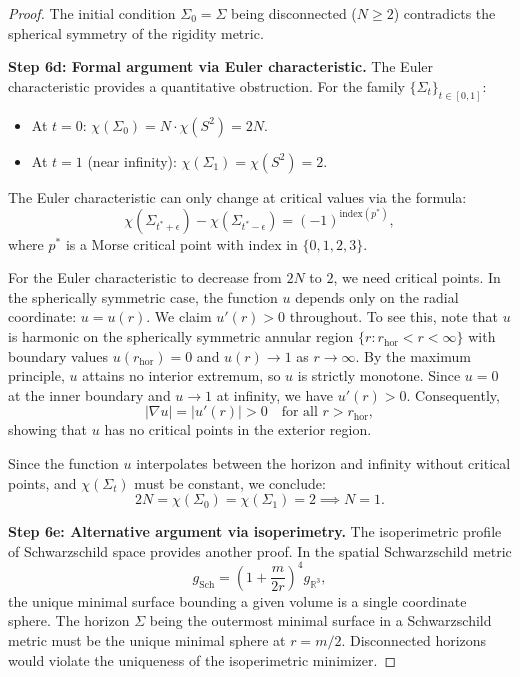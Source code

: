 \begin{proof}
The initial condition $\Sigma_0 = \Sigma$ being disconnected ($N \ge 2$) contradicts the spherical symmetry of the rigidity metric.

\textbf{Step 6d: Formal argument via Euler characteristic.}
The Euler characteristic provides a quantitative obstruction. For the family $\{\Sigma_t\}_{t \in [0,1]}$:
\begin{itemize}
    \item At $t = 0$: $\chi(\Sigma_0) = N \cdot \chi(S^2) = 2N$.
    \item At $t = 1$ (near infinity): $\chi(\Sigma_1) = \chi(S^2) = 2$.
\end{itemize}
The Euler characteristic can only change at critical values via the formula:
\begin{equation}
    \chi(\Sigma_{t^*+\epsilon}) - \chi(\Sigma_{t^*-\epsilon}) = (-1)^{\text{index}(p^*)},
\end{equation}
where $p^*$ is a Morse critical point with index in $\{0, 1, 2, 3\}$.

For the Euler characteristic to decrease from $2N$ to $2$, we need critical points. In the spherically symmetric case, the function $u$ depends only on the radial coordinate: $u = u(r)$. We claim $u'(r) > 0$ throughout. To see this, note that $u$ is harmonic on the spherically symmetric annular region $\{r : r_{\mathrm{hor}} < r < \infty\}$ with boundary values $u(r_{\mathrm{hor}}) = 0$ and $u(r) \to 1$ as $r \to \infty$. By the maximum principle, $u$ attains no interior extremum, so $u$ is strictly monotone. Since $u = 0$ at the inner boundary and $u \to 1$ at infinity, we have $u'(r) > 0$. Consequently,
\begin{equation}
    |\nabla u| = |u'(r)| > 0 \quad \text{for all } r > r_{\mathrm{hor}},
\end{equation}
showing that $u$ has no critical points in the exterior region. 

Since the function $u$ interpolates between the horizon and infinity without critical points, and $\chi(\Sigma_t)$ must be constant, we conclude:
\begin{equation}
    2N = \chi(\Sigma_0) = \chi(\Sigma_1) = 2 \implies N = 1.
\end{equation}

\textbf{Step 6e: Alternative argument via isoperimetry.}
The isoperimetric profile of Schwarzschild space provides another proof. In the spatial Schwarzschild metric
\begin{equation}
    g_{\text{Sch}} = \left(1 + \frac{m}{2r}\right)^4 g_{\mathbb{R}^3},
\end{equation}
the unique minimal surface bounding a given volume is a single coordinate sphere. The horizon $\Sigma$ being the outermost minimal surface in a Schwarzschild metric must be the unique minimal sphere at $r = m/2$. Disconnected horizons would violate the uniqueness of the isoperimetric minimizer.


\end{proof}
